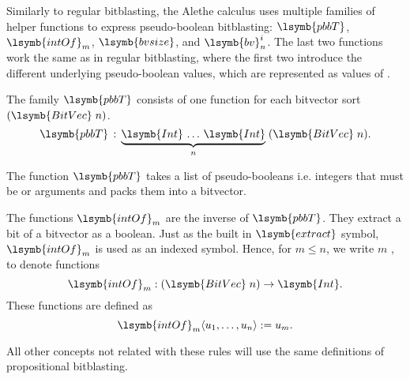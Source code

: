 Similarly to regular bitblasting, the Alethe calculus uses
multiple families of helper functions to express pseudo-boolean bitblasting:
$\lsymb{pbbT}$, $\lsymb{intOf}_m$, $\lsymb{bvsize}$, and $\lsymb{bv}_n^i$.
The last two functions work the same as in regular bitblasting, where the first two introduce the different
underlying pseudo-boolean values, which are represented as values of .

The family $\lsymb{pbbT}$ consists of one function for each bitvector sort
$(\lsymb{BitVec}\;n)$.
\[
    \lsymb{pbbT}\,:\,\underbrace{\lsymb{Int}\,\dots\,\lsymb{Int}}_n\;(\lsymb{BitVec}\;n).
\]

\noindent
The function $\lsymb{pbbT}$ takes a list of pseudo-booleans i.e. integers that must be
 or  arguments and packs them into a bitvector.

The functions $\lsymb{intOf}_m$ are the inverse of $\lsymb{pbbT}$.  They extract
a bit of a bitvector as a boolean.  Just as the built in $\lsymb{extract}$
symbol, $\lsymb{intOf}_m$ is used as an indexed symbol.  Hence, for $m \leq n$, we
write  $m$ \inlineAlethe{)}, to denote functions
\[
    \lsymb{intOf}_m : (\lsymb{BitVec}\;n) \to \lsymb{Int}.
\]
These functions are defined as
\[
    \lsymb{intOf}_m \langle u_1, \dots, u_n \rangle := u_m.
\]

All other concepts not related with these rules will use the same definitions of propositional
bitblasting.
